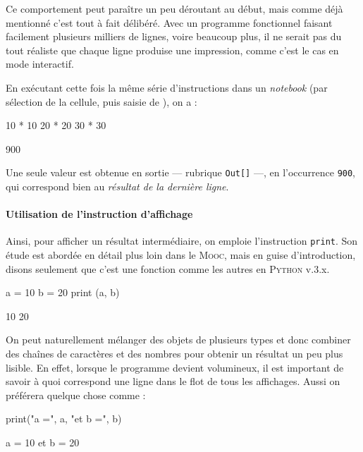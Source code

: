 Ce comportement peut paraître un peu déroutant au début, mais comme déjà mentionné c'est tout à fait délibéré. Avec un programme fonctionnel faisant facilement plusieurs milliers de lignes, voire beaucoup plus, il ne serait pas du tout réaliste que chaque ligne produise une impression, comme c'est le cas en mode interactif.

En exécutant cette fois la même série d'instructions dans un \textit{notebook} (par sélection de la cellule, puis saisie de ), on a :
\begin{nbjupyterin}[before skip=4pt, after skip=1pt]{1}
10 * 10
20 * 20
30 * 30
\end{nbjupyterin}
\begin{nbjupyterout}[after skip=2pt]{1}
900
\end{nbjupyterout}

Une seule valeur est obtenue en sortie --- rubrique \texttt{Out[]} ---, en l'occurrence \texttt{900}, qui correspond bien au \emph{résultat de la dernière ligne}.


\paragraph*{Utilisation de l'instruction d'affichage} Ainsi, pour afficher un résultat intermédiaire, on emploie l'instruction \texttt{print}. Son étude est abordée en détail plus loin dans le \textsc{Mooc}, mais en guise d'introduction, disons seulement que c'est une fonction comme les autres en \textsc{Python} v.3.x.

\begin{nbjupyterin}[before skip=4pt, after skip=1pt]{1}
a = 10
b = 20
print (a, b)
\end{nbjupyterin}
\begin{nbjupyterout}[before skip=4pt, after skip=0pt]{1}
10 20
\end{nbjupyterout}

On peut naturellement mélanger des objets de plusieurs types et donc combiner des chaînes de caractères et des nombres pour obtenir un résultat un peu plus lisible. En effet, lorsque le programme devient volumineux, il est important de savoir à quoi correspond une ligne dans le flot de tous les affichages. Aussi on préférera quelque chose comme :

\begin{nbjupyterin}[before skip=4pt, after skip=2pt]{2}
print("a =", a, "et b =", b)
\end{nbjupyterin}
\begin{nbjupyterout}[before skip=1pt]{2}
a = 10 et b = 20
\end{nbjupyterout}

